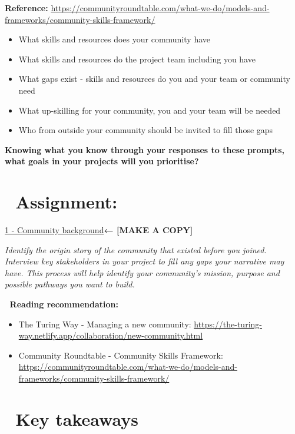 \documentclass[
  letterpaper,
  DIV=11,
  numbers=noendperiod]{scrreport}
\providecommand{\tightlist}{%
  \setlength{\itemsep}{0pt}\setlength{\parskip}{0pt}}\usepackage{longtable,booktabs,array}
\begin{document}
\textbf{Reference:}
\url{https://communityroundtable.com/what-we-do/models-and-frameworks/community-skills-framework/}

\begin{itemize}
\tightlist
\item
  What skills and resources does your community have
\item
  What skills and resources do the project team including you have
\item
  What gaps exist - skills and resources do you and your team or
  community need
\item
  What up-skilling for your community, you and your team will be needed
\item
  Who from outside your community should be invited to fill those gaps
\end{itemize}

\textbf{Knowing what you know through your responses to these prompts,
what goals in your projects will you prioritise?}

\hypertarget{assignment}{%
\section{\texorpdfstring{📝
\textbf{Assignment:}}{📝 Assignment:}}\label{assignment}}

\href{https://docs.google.com/document/d/1BjicBMiOIwcG_L-foD1XPVV3b3s6-lKt8DtGoOAKvjg/edit?usp=sharing}{1
- Community background}\textbf{← {[}MAKE A COPY{]}}

\emph{Identify the origin story of the community that existed before you
joined. Interview key stakeholders in your project to fill any gaps your
narrative may have. This process will help identify your community's
mission, purpose and possible pathways you want to build.}

📑 \textbf{Reading recommendation:}

\begin{itemize}
\tightlist
\item
  The Turing Way - Managing a new community:
  \url{https://the-turing-way.netlify.app/collaboration/new-community.html}
\item
  Community Roundtable - Community Skills Framework:
  \url{https://communityroundtable.com/what-we-do/models-and-frameworks/community-skills-framework/}
\end{itemize}

\hypertarget{key-takeaways}{%
\section{🏡 Key takeaways}\label{key-takeaways}}
\end{document}

